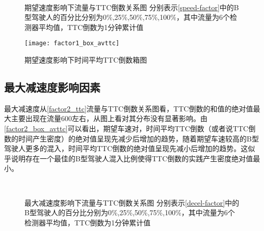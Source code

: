 \begin{figure}[!htb]%
\centering
{}%
\\%
%
\caption[A set of four sub-floats.]{期望速度影响下流量与TTC倒数关系图
分别表示\autoref{speed-factor}中的B型驾驶人的百分比分别为0\%,25\%,50\%,75\%,100\%，其中流量为6个检测器平均值，TTC倒数为1分钟累计值}%
\label{factor1_ttc}%
\end{figure}

\begin{figure}[!htb]
\begin{center}
\texttt{[image: factor1\_box\_avttc]}
\caption{期望速度影响下时间平均TTC倒数箱图}
\label{factor1_box_avttc}
\end{center}
\end{figure}

\subsection{最大减速度影响因素}

最大减速度从\autoref{factor2_ttc}流量与TTC倒数关系图看，TTC倒数的和值的绝对值最大主要出现在流量600左右，从图上看对其分布没有显著影响。由\autoref{factor2_box_avttc}可以看出，期望车速对，时间平均TTC倒数（或者说TTC倒数的时间产生密度）的绝对值呈现先减少后增加的趋势，随着期望车速较高的B型驾驶人更多的混入，时间平均TTC倒数的绝对值呈现先减小后增加的趋势。这似乎说明存在一个最佳的B型驾驶人混入比例使得TTC倒数的实践产生密度绝对值最小。
\begin{figure}[!htb]%
\centering
{}%
\\%
%
\caption[A set of four sub-floats.]{最大减速度影响下流量与TTC倒数关系图
分别表示\autoref{decel-factor}中的B型驾驶人的百分比分别为0\%,25\%,50\%,75\%,100\%，其中流量为6个检测器平均值，TTC倒数为1分钟累计值}%
\label{factor2_ttc}%
\end{figure}

